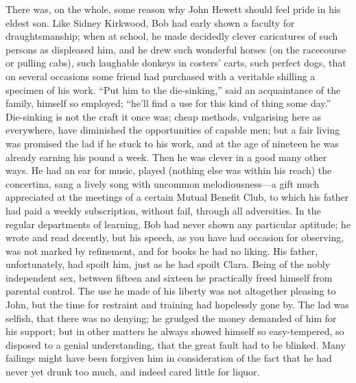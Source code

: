 There was, on the whole, some reason why John Hewett should feel pride
in his eldest son. Like Sidney Kirkwood, Bob had early shown a faculty
for draughtsmanship; when at school, he made decidedly clever
caricatures of such persons as displeased him, and he drew such
wonderful horses (on the racecourse or pulling cabs), such laughable
donkeys in costers' carts, such perfect dogs, that on several occasions
some friend had purchased with a veritable shilling a specimen of his
work. ``Put him to the die-sinking,'' said an acquaintance of the
family, himself so {\protect\hypertarget{169}{}{}}employed; ``he'll find
a use for this kind of thing some day.'' Die-sinking is not the craft it
once was; cheap methods, vulgarising here as everywhere, have diminished
the opportunities of capable men; but a fair living was promised the lad
if he stuck to his work, and at the age of nineteen he was already
earning his pound a week. Then he was clever in a good many other ways.
He had an ear for music, played (nothing else was within his reach) the
concertina, sang a lively song with uncommon melodiousness---a gift much
appreciated at the meetings of a certain Mutual Benefit Club, to which
his father had paid a weekly subscription, without fail, through all
adversities. In the regular departments of learning, Bob had never shown
any particular aptitude; he wrote and read decently, but his speech, as
you have had occasion for observing, was not marked by refinement, and
for books he had no liking. His father, unfortunately, had spoilt him,
just as he had spoilt Clara. Being of the nobly independent sex, between
{\protect\hypertarget{170}{}{}}fifteen and sixteen he practically freed
himself from parental control. The use he made of his liberty was not
altogether pleasing to John, but the time for restraint and training had
hopelessly gone by. The lad was selfish, that there was no denying; he
grudged the money demanded of him for his support; but in other matters
he always showed himself so easy-tempered, so disposed to a genial
understanding, that the great fault had to be blinked. Many failings
might have been forgiven him in consideration of the fact that he had
never yet drunk too much, and indeed cared little for liquor.

